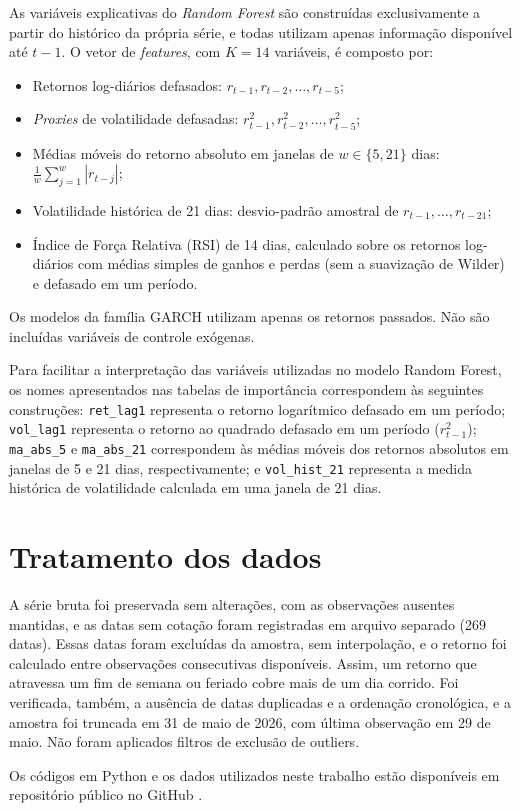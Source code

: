 As variáveis explicativas do \textit{Random Forest} são construídas exclusivamente a partir do histórico da própria série, e todas utilizam apenas informação disponível até $t-1$. O vetor de \textit{features}, com $K = 14$ variáveis, é composto por:
\begin{itemize}
    \item Retornos log-diários defasados: $r_{t-1}, r_{t-2}, \ldots, r_{t-5}$;
    \item \textit{Proxies} de volatilidade defasadas: $r_{t-1}^2, r_{t-2}^2, \ldots, r_{t-5}^2$;
    \item Médias móveis do retorno absoluto em janelas de $w \in \{5, 21\}$ dias: $\frac{1}{w}\sum_{j=1}^{w}|r_{t-j}|$;
    \item Volatilidade histórica de 21 dias: desvio-padrão amostral de $r_{t-1}, \ldots, r_{t-21}$;
    \item Índice de Força Relativa (RSI) de 14 dias, calculado sobre os retornos log-diários com médias simples de ganhos e perdas (sem a suavização de Wilder) e defasado em um período.
\end{itemize}

Os modelos da família GARCH utilizam apenas os retornos passados. Não são incluídas variáveis de controle exógenas.

Para facilitar a interpretação das variáveis utilizadas no modelo Random Forest, os nomes apresentados nas tabelas de importância correspondem às seguintes construções: \texttt{ret\_lag1} representa o retorno logarítmico defasado em um período; 
\texttt{vol\_lag1} representa o retorno ao quadrado defasado em um período (\(r_{t-1}^{2}\)); \texttt{ma\_abs\_5} e \texttt{ma\_abs\_21} correspondem às médias móveis dos retornos absolutos em janelas de 5 e 21 dias, respectivamente; e 
\texttt{vol\_hist\_21} representa a medida histórica de volatilidade calculada em uma janela de 21 dias.

\section{Tratamento dos dados}

A série bruta foi preservada sem alterações, com as observações ausentes mantidas, e as datas sem cotação foram registradas em arquivo separado (269 datas). Essas datas foram excluídas da amostra, sem interpolação, 
e o retorno foi calculado entre observações consecutivas disponíveis. Assim, um retorno que atravessa um fim de semana ou feriado cobre mais de um dia corrido. Foi verificada, também, a ausência de datas duplicadas 
e a ordenação cronológica, e a amostra foi truncada em 31 de maio de 2026, com última observação em 29 de maio. Não foram aplicados filtros de exclusão de outliers.

Os códigos em Python e os dados utilizados neste trabalho estão disponíveis
em repositório público no GitHub \cite{ribeiro2026codigo}.
